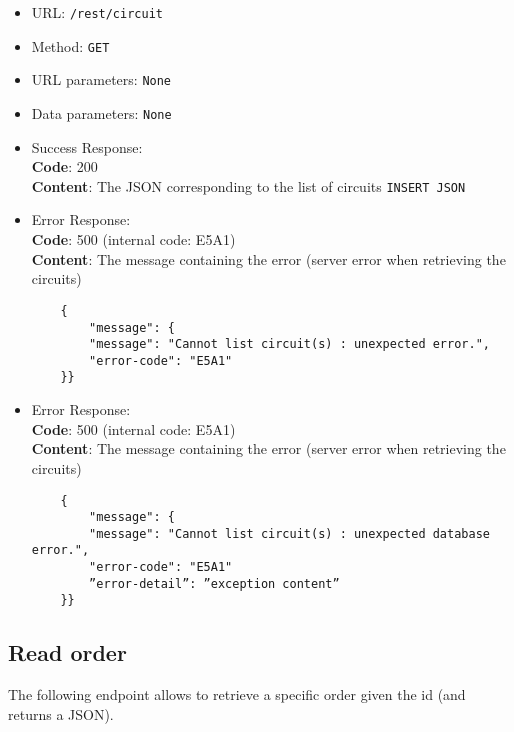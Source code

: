 \begin{itemize}
    \item URL: \texttt{/rest/circuit}
    \item Method: \texttt{GET}
    \item URL parameters: \texttt{None}
    \item Data parameters: \texttt{None}
    \item Success Response: \\
        \textbf{Code}: 200\\
        \textbf{Content}: The JSON corresponding to the list of circuits
        \texttt{INSERT JSON}
    \item Error Response:\\
    \textbf{Code}: 500 (internal code: E5A1)\\
    \textbf{Content}: The message containing the error (server error when retrieving the circuits)\\
    \begin{verbatim}
    {
        "message": {
        "message": "Cannot list circuit(s) : unexpected error.",
        "error-code": "E5A1"
    }}
    \end{verbatim}
    \item Error Response:\\
    \textbf{Code}: 500 (internal code: E5A1)\\
    \textbf{Content}: The message containing the error (server error when retrieving the circuits)\\
    \begin{verbatim}
    {
        "message": {
        "message": "Cannot list circuit(s) : unexpected database error.",
        "error-code": "E5A1"
        ”error-detail”: ”exception content”
    }}
    \end{verbatim}
    
\end{itemize}

\subsection*{Read order}

The following endpoint allows to retrieve a specific order given the id (and returns a JSON).

